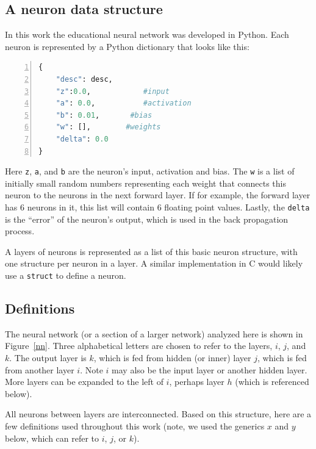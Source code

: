 \documentclass[12pt]{article}
\begin{document}
\subsection{A neuron data structure}

In this work the educational neural network was developed in Python.  Each neuron is represented by a Python dictionary that looks like this:

\begin{lstlisting}[language=Python,
		basicstyle=\small\ttfamily,
                 numbers=left,
                 stepnumber=1,
                 numbersep=8pt,
                 tabsize=2,
                 showspaces=false,
                 breaklines=true,
                 showstringspaces=false,
                 columns=fullflexible]
 {
    "desc": desc,
    "z":0.0,        	#input
    "a": 0.0,       	#activation
    "b": 0.01,       #bias
    "w": [],     	#weights
    "delta": 0.0
}
\end{lstlisting}
Here {\tt z}, {\tt a}, and {\tt b} are the neuron's input, activation and bias. The {\tt w} is a list of  initially small random numbers representing each weight that connects this neuron to the neurons in the next forward layer. If for example, the forward layer has $6$ neurons in it, this list will contain $6$ floating point values. Lastly, the {\tt delta} is the ``error'' of the neuron's output, which is used in the back propagation process.

A layers of neurons is represented as a list of this basic neuron structure, with one structure per neuron in a layer.  A similar implementation in C would likely use a {\tt struct} to define a neuron. 



\subsection{Definitions}
\label{definitions}

The neural network (or a section of a larger network) analyzed here is shown in Figure~\ref{nn}.  Three alphabetical letters are chosen to refer to the layers, $i$, $j$, and $k$.  The output layer is $k$, which is fed from hidden (or inner) layer $j$, which is fed from another layer $i$. Note $i$ may also be the input layer or another hidden layer.  More layers can be expanded to the left of $i$, perhaps layer $h$ (which is referenced below). 

All neurons between layers are interconnected.  Based on this structure, here are a few definitions used throughout this work (note, we used the generics $x$ and $y$ below, which can refer to $i$, $j$, or $k$).
\end{document}
